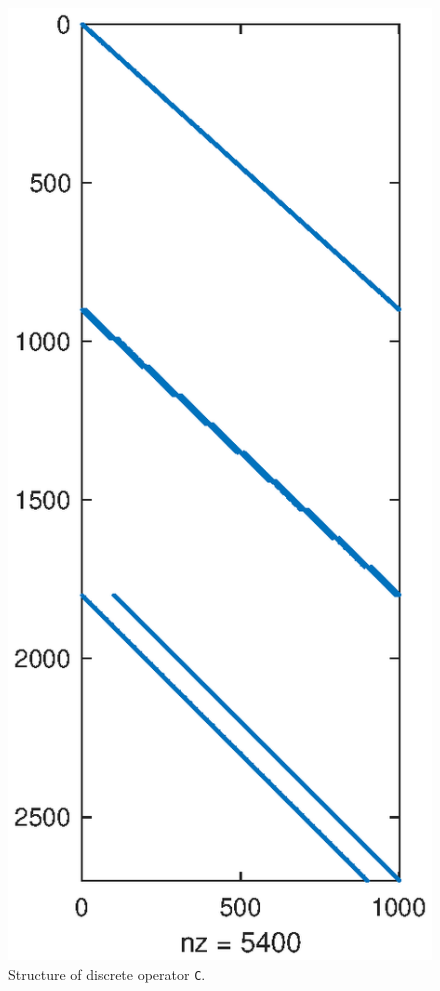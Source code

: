 \begin{figure}
    \includegraphics[width=\linewidth]{figures/flowSolver_discrete_operators_C.eps}
    \caption{Structure of discrete operator \texttt{C}.}
    \label{fig:discreteOperatorsC}
\end{figure}

